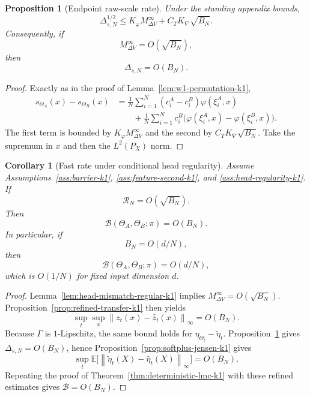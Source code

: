 \documentclass[11pt]{article}
\newtheorem{proposition}[theorem]{Proposition}
\newtheorem{corollary}[theorem]{Corollary}
\theoremstyle{definition}
\newcommand{\E}{\mathbb{E}}
\newcommand{\norm}[1]{\left\lVert #1 \right\rVert}
\newcommand{\mc}[1]{\mathcal{#1}}
\newcommand{\cB}{\mathcal{B}}
\begin{document}
\begin{proposition}[Endpoint raw-scale rate]
\label{prop:scale-rate-k1}
Under the standing appendix bounds,
\begin{equation}
  \Delta_{s,N}^{1/2}
  \le
  K_\varphi M_{\Delta V}^\infty + C_TK_{\nabla}\sqrt{B_N}.
  \label{eq:scale-rate-k1}
\end{equation}
Consequently, if
\[
  M_{\Delta V}^\infty=O(\sqrt{B_N}),
\]
then
\[
  \Delta_{s,N}=O(B_N).
\]
\end{proposition}

\begin{proof}
Exactly as in the proof of Lemma~\ref{lem:w1-permutation-k1},
\begin{align*}
  s_{\Theta_A}(x)-s_{\Theta_B}(x)
  &=
  \frac1N\sum_{i=1}^N
  (c_i^A-c_i^B)\varphi(\xi_i^A,x)
  \\
  &\qquad
  +
  \frac1N\sum_{i=1}^N
  c_i^B\bigl(\varphi(\xi_i^A,x)-\varphi(\xi_i^B,x)\bigr).
\end{align*}
The first term is bounded by $K_\varphi M_{\Delta V}^\infty$ and the second by
$C_TK_{\nabla}\sqrt{B_N}$. Take the supremum in $x$ and then the
$L^2(P_X)$ norm.
\end{proof}

\begin{corollary}[Fast rate under conditional head regularity]
\label{cor:fast-rate-k1}
Assume Assumptions~\ref{ass:barrier-k1}, \ref{ass:feature-second-k1}, and
\ref{ass:head-regularity-k1}. If
\[
  \mc{R}_N=O(\sqrt{B_N}).
\]
Then
\[
  \cB(\Theta_A,\Theta_B;\pi)=O(B_N).
\]
In particular, if
\[
  B_N=O(d/N),
\]
then
\[
  \cB(\Theta_A,\Theta_B;\pi)=O(d/N),
\]
which is $O(1/N)$ for fixed input dimension $d$.
\end{corollary}

\begin{proof}
Lemma~\ref{lem:head-mismatch-regular-k1} implies
$M_{\Delta V}^\infty=O(\sqrt{B_N})$. Proposition~\ref{prop:refined-transfer-k1}
then yields
\[
  \sup_t\sup_x \norm{z_t(x)-\hat z_t(x)}_\infty = O(B_N).
\]
Because $\Gamma$ is $1$-Lipschitz, the same bound holds for
$\eta_{\Theta_t}-\tilde\eta_t$. Proposition~\ref{prop:scale-rate-k1} gives
$\Delta_{s,N}=O(B_N)$, hence Proposition~\ref{prop:softplus-jensen-k1} gives
\[
  \sup_t \E\big[\norm{\tilde\eta_t(X)-\hat\eta_t(X)}_\infty\big]=O(B_N).
\]
Repeating the proof of Theorem~\ref{thm:deterministic-lmc-k1} with these
refined estimates gives $\cB=O(B_N)$.
\end{proof}
\end{document}
